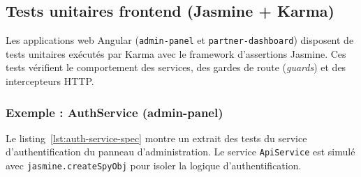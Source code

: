 \subsection{Tests unitaires frontend (Jasmine + Karma)}
\label{subsec:tests-unitaires-frontend}

Les applications web Angular (\texttt{admin-panel} et \texttt{partner-dashboard})
disposent de tests unitaires exécutés par Karma avec le framework d'assertions Jasmine.
Ces tests vérifient le comportement des services, des gardes de route (\textit{guards})
et des intercepteurs HTTP.

\subsubsection{Exemple : AuthService (admin-panel)}

Le listing~\ref{lst:auth-service-spec} montre un extrait des tests du service
d'authentification du panneau d'administration. Le service \texttt{ApiService} est simulé
avec \texttt{jasmine.createSpyObj} pour isoler la logique d'authentification.

